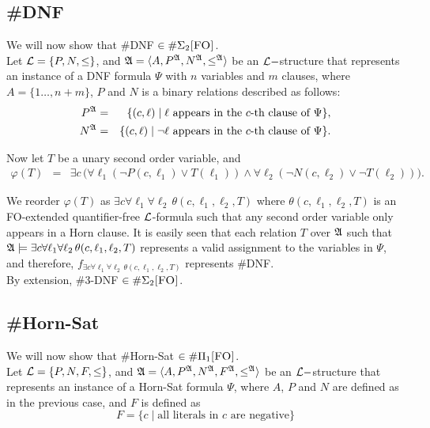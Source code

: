 \subsection{{\sc \#DNF}} \label{dnfdef}
We will now show that {\sc \#DNF} $\in\#\Sigma_{2}\textsc{[FO]}$.\\

Let ${\cal L} = \{P,N,\leq\}$, and ${\frak A} = \langle A, P^{\frak A}, N^{\frak A}, \leq^{\frak A} \rangle$ be an ${\cal L}-$structure that represents an instance of a {\sc DNF} formula $\Psi$ with $n$ variables and $m$ clauses, where $A = \{1\ldots,n+m\}$, $P$ and $N$ is a binary relations described as follows:
\begin{eqnarray*}
P^{\frak A} &=& \{(c,\ell)\mid \ell \mbox{ appears in the $c$-th clause of }\Psi\},\\
N^{\frak A} &=& \{(c,\ell)\mid \neg \ell \mbox{ appears in the $c$-th clause of }\Psi\}.
\end{eqnarray*}

Now let $T$ be a unary second order variable, and
\begin{eqnarray*}
\varphi(T) &=& \exists c \,\Big(\forall \ell_1 (\neg P(c,\ell_1) \vee T(\ell_1)) \wedge \forall \ell_2 (\neg N(c,\ell_2) \vee \neg T(\ell_2))\Big). 
\end{eqnarray*}

We reorder $\varphi(T)$ as $\exists c \forall \ell_1 \forall \ell_2\, \theta(c,\ell_1,\ell_2,T)$ where $\theta(c,\ell_1,\ell_2,T)$ is an {\sc FO}-extended quantifier-free ${\cal L}$-formula such that any second order variable only appears in a Horn clause. It is easily seen that each relation $T$ over ${\frak A}$ such that ${\frak A}\models \exists c \forall \ell_1 \forall \ell_2\, \theta(c,\ell_1,\ell_2,T)$ represents a valid assignment to the variables in $\Psi$, and therefore, $f_{\exists c \forall \ell_1 \forall \ell_2\, \theta(c,\ell_1,\ell_2,T)}$ represents {\sc \#DNF}.\\

By extension, {\sc \#3-DNF} $\in\#\Sigma_{2}\textsc{[FO]}$.

\subsection{{\sc \#Horn-Sat}}
We will now show that {\sc \#Horn-Sat} $\in\#\Pi_{1}\textsc{[FO]}$.\\

Let ${\cal L} = \{P,N,F,\leq\}$, and ${\frak A} = \langle A, P^{\frak A}, N^{\frak A}, F^{\frak A}, \leq^{\frak A} \rangle$ be an ${\cal L}-$structure that represents an instance of a {\sc Horn-Sat} formula $\Psi$, where $A$, $P$ and $N$ are defined as in the previous case, and $F$ is defined as
\[
	F = \{ c \mid
		\mbox{all literals in $c$ are negative}
	\}
\]

